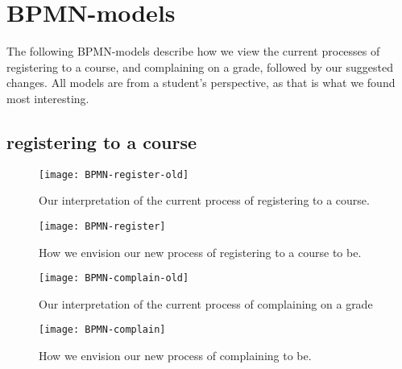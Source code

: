 \section{BPMN-models}
	The following BPMN-models\cite{bpmn} describe how we view the current processes of registering to a course, and complaining on a grade, followed by our suggested changes.
All models are from a student's perspective, as that is what we found most interesting.

\subsection{registering to a course}
		
\begin{figure}[H]
    \centering
    \texttt{[image: BPMN-register-old]}%
    \caption{Our interpretation of the current process of registering to a course.}
    \label{fig:Register-old}
\end{figure}

\begin{figure}[H]
    \centering
    \texttt{[image: BPMN-register]}
    \caption{How we envision our new process of registering to a course to be.}
    \label{fig:Register-new}
\end{figure}

\begin{figure}[H]
    \centering
    \texttt{[image: BPMN-complain-old]}
    \caption{Our interpretation of the current process of complaining on a grade}
    \label{fig:Complain-old}
\end{figure}

\begin{figure}[H]
    \centering
    \texttt{[image: BPMN-complain]}
    \caption{How we envision our new process of complaining to be.}
    \label{fig:Complain-new}
\end{figure}
